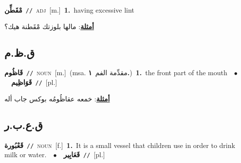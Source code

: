 \documentclass[10pt,a4paper,twoside]{article} %
\begin{document}
\begin{multicols}{2}
{\setlength\topsep{0pt}\textbf{\foreignlanguage{arabic}{مْقَطِّن}}\ {\color{gray}\texttt{//}\color{black}}\ \textsc{adj}\ [m.]\ \textbf{1.}~having excessive lint\  \begin{flushright}\color{gray}\foreignlanguage{arabic}{\textbf{\underline{\foreignlanguage{arabic}{أمثلة}}}: مالها بلوزتك مْقَطنة هيك؟}\end{flushright}\color{black}} \vspace{2mm}

\vspace{-3mm}
\subsection*{\color{blue}\foreignlanguage{arabic}{ق.ظ.م}\color{blue}{}} 

{\setlength\topsep{0pt}\textbf{\foreignlanguage{arabic}{قَاظُوم}}\ {\color{gray}\texttt{//}\color{black}}\ \textsc{noun}\ [m.]\ \color{gray}(msa. \foreignlanguage{arabic}{مقدِّمة الفم}~\foreignlanguage{arabic}{\textbf{١.}})\color{black}\ \textbf{1.}~the front part of the mouth\ \ $\bullet$\ \ \setlength\topsep{0pt}\textbf{\foreignlanguage{arabic}{قَوَاظِيم}}\ {\color{gray}\texttt{//}\color{black}}\ [pl.]\  \begin{flushright}\color{gray}\foreignlanguage{arabic}{\textbf{\underline{\foreignlanguage{arabic}{أمثلة}}}: خمعه عقاظُومُه بوكس جاب أله}\end{flushright}\color{black}} \vspace{2mm}

\vspace{-3mm}
\subsection*{\color{blue}\foreignlanguage{arabic}{ق.ع.ب.ر}\color{blue}{}} 

{\setlength\topsep{0pt}\textbf{\foreignlanguage{arabic}{قَعْبُورة}}\ {\color{gray}\texttt{//}\color{black}}\ \textsc{noun}\ [f.]\ \textbf{1.}~It is a small vessel that children use in order to drink milk or water.\ \ $\bullet$\ \ \setlength\topsep{0pt}\textbf{\foreignlanguage{arabic}{قَعَابِير}}\ {\color{gray}\texttt{//}\color{black}}\ [pl.]\ } \vspace{2mm}


\end{multicols}
\end{document}
